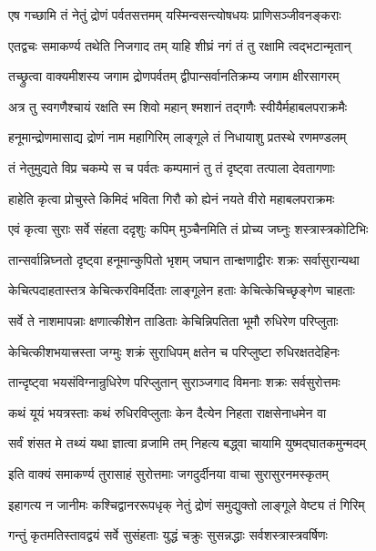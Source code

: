 \twolineshloka
{एष गच्छामि तं नेतुं द्रोणं पर्वतसत्तमम्}
{यस्मिन्वसन्त्योषधयः प्राणिसञ्जीवनङ्कराः}%

\twolineshloka
{एतद्वचः समाकर्ण्य तथेति निजगाद तम्}
{याहि शीघ्रं नगं तं तु रक्षामि त्वद्भटान्मृतान्}%

\twolineshloka
{तच्छ्रुत्वा वाक्यमीशस्य जगाम द्रोणपर्वतम्}
{द्वीपान्सर्वानतिक्रम्य जगाम क्षीरसागरम्}%

\twolineshloka
{अत्र तु स्वगणैश्चायं रक्षति स्म शिवो महान्}
{श्मशानं तद्गणैः स्वीयैर्महाबलपराक्रमैः}%

\twolineshloka
{हनूमान्द्रोणमासाद्य द्रोणं नाम महागिरिम्}
{लाङ्गूले तं निधायाशु प्रतस्थे रणमण्डलम्}%

\twolineshloka
{तं नेतुमुद्यते विप्र चकम्पे स च पर्वतः}
{कम्पमानं तु तं दृष्ट्वा तत्पाला देवतागणाः}%

\twolineshloka
{हाहेति कृत्वा प्रोचुस्ते किमिदं भविता गिरौ}
{को ह्येनं नयते वीरो महाबलपराक्रमः}%

\twolineshloka
{एवं कृत्वा सुराः सर्वे संहता ददृशुः कपिम्}
{मुञ्चैनमिति तं प्रोच्य जघ्नुः शस्त्रास्त्रकोटिभिः}%

\twolineshloka
{तान्सर्वान्निघ्नतो दृष्ट्वा हनूमान्कुपितो भृशम्}
{जघान तान्क्षणाद्वीरः शक्रः सर्वासुरान्यथा}%

\twolineshloka
{केचित्पदाहतास्तत्र केचित्करविमर्दिताः}
{लाङ्गूलेन हताः केचित्केचिच्छृङ्गेण चाहताः}%

\twolineshloka
{सर्वे ते नाशमापन्नाः क्षणात्कीशेन ताडिताः}
{केचिन्निपतिता भूमौ रुधिरेण परिप्लुताः}%

\twolineshloka
{केचित्कीशभयात्त्रस्ता जग्मुः शक्रं सुराधिपम्}
{क्षतेन च परिप्लुष्टा रुधिरक्षतदेहिनः}%

\twolineshloka
{तान्दृष्ट्वा भयसंविग्नान्रुधिरेण परिप्लुतान्}
{सुराञ्जगाद विमनाः शक्रः सर्वसुरोत्तमः}%

\twolineshloka
{कथं यूयं भयत्रस्ताः कथं रुधिरविप्लुताः}
{केन दैत्येन निहता राक्षसेनाधमेन वा}%

\twolineshloka
{सर्वं शंसत मे तथ्यं यथा ज्ञात्वा व्रजामि तम्}
{निहत्य बद्ध्वा चायामि युष्मद्घातकमुन्मदम्}%

\twolineshloka
{इति वाक्यं समाकर्ण्य तुरासाहं सुरोत्तमाः}
{जगदुर्दीनया वाचा सुरासुरनमस्कृतम्}%


\twolineshloka
{इहागत्य न जानीमः कश्चिद्वानररूपधृक्}
{नेतुं द्रोणं समुद्युक्तो लाङ्गूले वेष्ट्य तं गिरिम्}%

\twolineshloka
{गन्तुं कृतमतिस्तावद्वयं सर्वे सुसंहताः}
{युद्धं चक्रुः सुसन्नद्धाः सर्वशस्त्रास्त्रवर्षिणः}%

